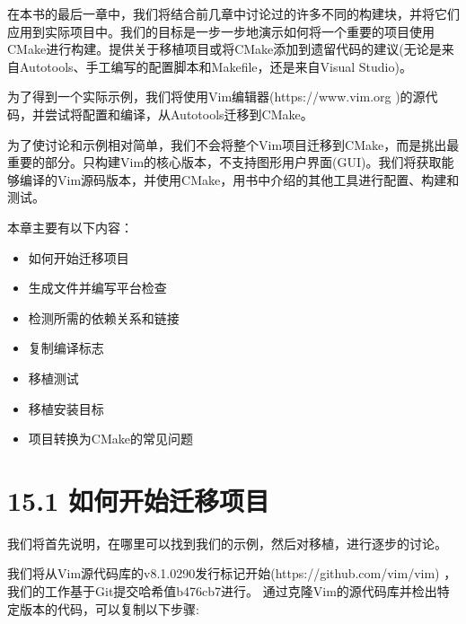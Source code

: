 在本书的最后一章中，我们将结合前几章中讨论过的许多不同的构建块，并将它们应用到实际项目中。我们的目标是一步一步地演示如何将一个重要的项目使用CMake进行构建。提供关于移植项目或将CMake添加到遗留代码的建议(无论是来自Autotools、手工编写的配置脚本和Makefile，还是来自Visual Studio)。

为了得到一个实际示例，我们将使用Vim编辑器(https://www.vim.org )的源代码，并尝试将配置和编译，从Autotools迁移到CMake。

为了使讨论和示例相对简单，我们不会将整个Vim项目迁移到CMake，而是挑出最重要的部分。只构建Vim的核心版本，不支持图形用户界面(GUI)。我们将获取能够编译的Vim源码版本，并使用CMake，用书中介绍的其他工具进行配置、构建和测试。

本章主要有以下内容：

\begin{itemize}
\item 如何开始迁移项目

\item 生成文件并编写平台检查

\item 检测所需的依赖关系和链接

\item 复制编译标志

\item 移植测试

\item 移植安装目标

\item 项目转换为CMake的常见问题

\end{itemize}


\section{15.1 如何开始迁移项目}

我们将首先说明，在哪里可以找到我们的示例，然后对移植，进行逐步的讨论。


我们将从Vim源代码库的v8.1.0290发行标记开始(https://github.com/vim/vim) ，我们的工作基于Git提交哈希值b476cb7进行。 通过克隆Vim的源代码库并检出特定版本的代码，可以复制以下步骤:


